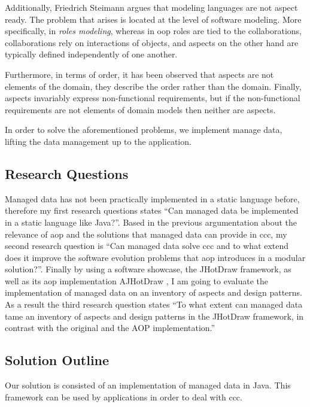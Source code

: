 Additionally, Friedrich Steimann \cite{steimann2005domain} argues that modeling languages are not aspect ready. 
The problem that arises is located at the level of software modeling. 
More specifically, in \textit{roles modeling}, whereas in \ac{oop} roles are tied to the collaborations,
collaborations rely on interactions of objects, and aspects on the other hand are typically defined independently of one another. 

Furthermore, in terms of order, it has been observed that aspects are not elements of the domain, they describe the order rather than the domain. 
Finally, aspects invariably express non-functional requirements, but if the non-functional requirements are not elements of domain models then neither are aspects.

In order to solve the aforementioned problems, we implement manage data, lifting the data management up to the application.

\subsection{Research Questions}\label{Research Questions}
Managed data has not been practically implemented in a static language before, therefore my first research questions states 
``Can managed data be implemented in a static language like Java?''. 
Based in the previous argumentation about the relevance of \ac{aop} and the solutions that managed data can provide in \ac{ccc}, my second research question is ``Can managed data solve \ac{ccc} and to what extend does it improve the software evolution problems that \ac{aop} introduces in a modular solution?''. 
Finally by using a software showcase, the JHotDraw framework, as well as its \ac{aop} implementation AJHotDraw \cite{marinajhotdraw}, 
I am going to evaluate the implementation of managed data on an inventory of aspects and design patterns. 
As a result the third research question states ``To what extent can managed data tame an inventory of aspects and design patterns in the JHotDraw framework, in contrast with the original and the AOP implementation.''

\subsection{Solution Outline}\label{Solution Outline}
Our solution is consisted of an implementation of managed data in Java. 
This framework can be used by applications in order to deal with \ac{ccc}.


